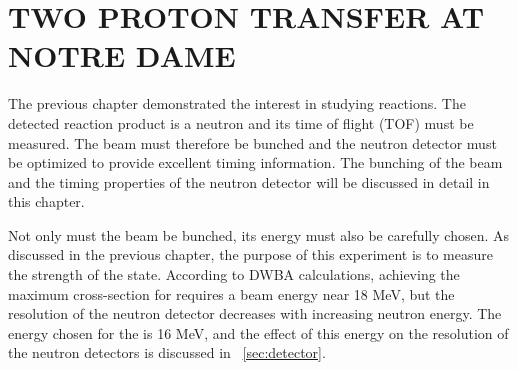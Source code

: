 %
%
%
%
%
%
%
%

%
%

\chapter{TWO PROTON TRANSFER AT NOTRE DAME}
\label{chap:2pExpt}

The previous chapter demonstrated the interest in studying \reaction reactions.  The detected reaction product is a neutron and its time of flight (TOF) must be measured.  The beam must therefore be bunched and the neutron detector must be optimized to provide excellent timing information.  The bunching of the beam and the timing properties of the neutron detector will be discussed in detail in this chapter.   


Not only must the beam be bunched, its energy must also be carefully chosen.  As discussed in the previous chapter, the purpose of this experiment is to measure the strength of the \zp state.  According to DWBA calculations, achieving the maximum \zp cross-section for \reaction requires a beam energy near 18 MeV, but the resolution of the neutron detector decreases with increasing neutron energy.  The energy chosen for the  is 16 MeV, and the effect of this energy on the resolution of the neutron detectors is discussed in \sec~\ref{sec:detector}.


